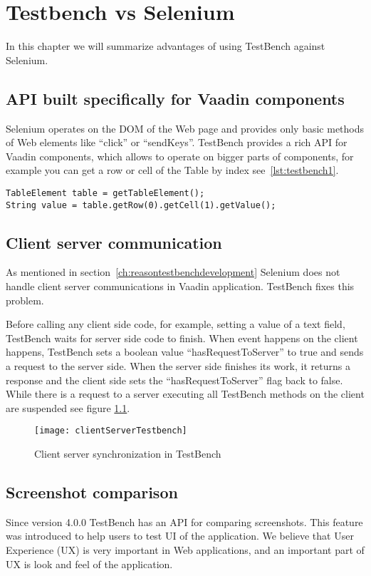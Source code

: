\chapter{Testbench vs Selenium}
\label{ch:testbenchvsselenium}
In this chapter we will summarize advantages of using TestBench against
Selenium.

\section{API built specifically for Vaadin components}
Selenium operates on the DOM of the Web page and provides only basic methods of
Web elements like ``click'' or ``sendKeys''. TestBench provides a rich API for
Vaadin components, which allows to operate on bigger parts of components, for
 example you can get a row or cell of the Table by index
 see~\ref{lst:testbench1}.
  	\lstset{language=Java}
  	\begin{lstlisting}[caption=Get Vaadin Table cell Value,label={lst:testbench1}]
TableElement table = getTableElement();
String value = table.getRow(0).getCell(1).getValue();
	\end{lstlisting}
	
\section{Client server communication}
As mentioned in section~\ref{ch:reasontestbenchdevelopment}
Selenium does not handle client server communications in Vaadin
application. TestBench fixes this problem.

Before calling any client side code, for example, setting a value of a
text field, TestBench waits for server side code to finish. When event happens
on the client happens, TestBench sets a boolean value ``hasRequestToServer'' to
true and sends a request to the server side. When the server side finishes its
work, it returns a response and the client side sets the ``hasRequestToServer''
flag back to false. While there is a request to a server executing all TestBench
methods on the client are suspended see figure \ref{fig:clientServerTestbench}.  
	\begin{figure}
	\label{fig:clientServerTestbench}
	\texttt{[image: clientServerTestbench]}
	\caption{Client server synchronization in TestBench}
	\end{figure}

\section{Screenshot comparison}
\label{sec:screencompare}
Since version 4.0.0 TestBench has an API for comparing screenshots. This 
feature was introduced to help users to test UI of the application. We believe
that User Experience (UX) is very important in Web applications, and an
important part of UX is look and feel of the application.


